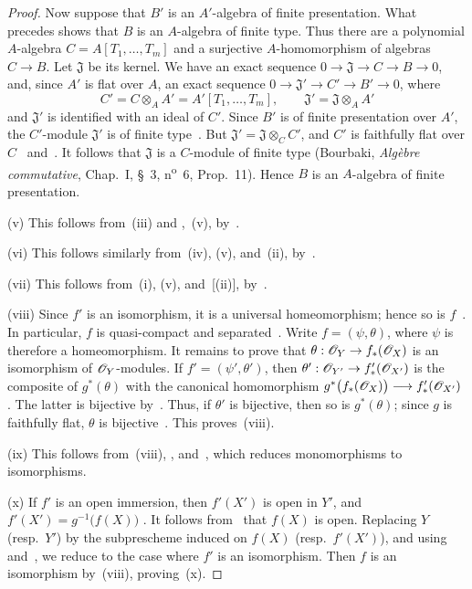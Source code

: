 \begin{proof}
Now suppose that $B'$ is an $A'$-algebra of finite presentation. What
precedes shows that $B$ is an $A$-algebra of finite type. Thus there
are a polynomial $A$-algebra $C=A[T_1,\ldots,T_m]$ and a surjective
$A$-homomorphism of algebras $C\to B$. Let $\mathfrak{J}$ be its
kernel. We have an exact sequence $0\to\mathfrak{J}\to C\to B\to0$,
and, since $A'$ is flat over $A$, an exact sequence $0\to\mathfrak{J}'\to C'\to B'\to0$,
where
\[
  C'=C\otimes_A A'=A'[T_1,\ldots,T_m],
  \qquad
  \mathfrak{J}'=\mathfrak{J}\otimes_A A'
\]
and $\mathfrak{J}'$ is identified with an ideal of $C'$. Since $B'$ is
of finite presentation over $A'$, the $C'$-module $\mathfrak{J}'$ is
of finite type~. But
$\mathfrak{J}'=\mathfrak{J}\otimes_C C'$, and $C'$ is faithfully flat
over $C$~ and~. It follows that
$\mathfrak{J}$ is a $C$-module of finite type
\textnormal{(}Bourbaki, \emph{Alg\`ebre commutative}, Chap.~I, \S~3,
n\textsuperscript{o}~6, Prop.~11\textnormal{)}. Hence $B$ is an $A$-algebra of finite
presentation.

\textnormal{(v)} This follows from~\textnormal{(iii)} and
,~(v), by~.

\textnormal{(vi)} This follows similarly from~\textnormal{(iv)},
\textnormal{(v)}, and~\textnormal{(ii)}, by~.

\textnormal{(vii)} This follows from~\textnormal{(i)},
\textnormal{(v)}, and~[\textup{(ii)}], by~.

\textnormal{(viii)} Since $f'$ is an isomorphism, it is a universal
homeomorphism; hence so is $f$~. In particular, $f$ is
quasi-compact and separated~. Write
$f=(\psi,\theta)$, where $\psi$ is therefore a homeomorphism. It remains
to prove that $\theta:\mathscr{O}_Y\to f_*(\mathscr{O}_X)$
is an isomorphism of $\mathscr{O}_Y$-modules. If
$f'=(\psi',\theta')$, then $\theta':\mathscr{O}_{Y'}\to f'_*(\mathscr{O}_{X'})$
is the composite of $g^*(\theta)$ with the canonical homomorphism $g^*\bigl(f_*(\mathscr{O}_X)\bigr)\longrightarrow f'_*(\mathscr{O}_{X'})$
. The latter is bijective by~. Thus,
if $\theta'$ is bijective, then so is $g^*(\theta)$; since $g$ is
faithfully flat, $\theta$ is bijective~. This
proves~\textnormal{(viii)}.

\textnormal{(ix)} This follows from~\textnormal{(viii)},
, and~, which reduces
monomorphisms to isomorphisms.

\textnormal{(x)} If $f'$ is an open immersion, then $f'(X')$ is open
in $Y'$, and $f'(X')=g^{-1}\bigl(f(X)\bigr)$
. It follows from~ that $f(X)$ is
open. Replacing $Y$ \textnormal{(}resp.\ $Y'$\textnormal{)} by the
subprescheme induced on $f(X)$ \textnormal{(}resp.\ $f'(X')$\textnormal{)},
and using~ and~, we reduce to the case
where $f'$ is an isomorphism. Then $f$ is an isomorphism
by~\textnormal{(viii)}, proving~\textnormal{(x)}.


\end{proof}
